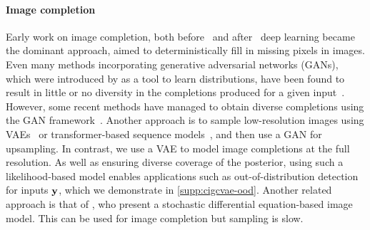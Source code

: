 \paragraph{Image completion}
Early work on image completion, both
before~\citep{bertalmio2000image,bertalmio2001navier,ballester2001filling,levin2003learning,criminisi2003object}
and after~\citep{kohler2014mask,ren2015shepard} deep learning became the
dominant approach, aimed to deterministically fill in missing pixels in images.
Even many methods incorporating generative adversarial networks (GANs), which
were introduced by \citet{goodfellow2014generative} as a tool to learn
distributions, have been found to result in little or no diversity in the
completions produced for a given
input~\citep{song2018spg,yu2018generative,yu2019free,pathak2016context,iizuka2017globally}.
%
However, some recent methods have managed to obtain diverse completions using
the GAN framework~\citep{zhao2020uctgan,zhao2021large,liu2021pd}.
%
Another approach is to sample low-resolution images using
VAEs~\citep{zheng2019pluralistic,peng2021generating} or transformer-based
sequence models~\citep{zheng2021tfill,wan2021high}, and then use a GAN for
upsampling. In contrast, we use a VAE to model image completions at the full
resolution. As well as ensuring diverse coverage of the posterior, using such a
likelihood-based model enables applications such as out-of-distribution
detection for inputs ${\mathbf{y}}$, which we demonstrate in \cref{supp:cigcvae-ood}.
Another related approach is that of \citet{song2020score}, who present a
stochastic differential equation-based image model. This can be used for image
completion but sampling is slow.



